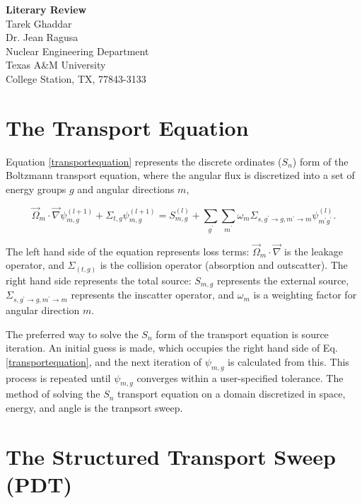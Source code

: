 \documentclass[11pt, letterpaper,titlepage,oneside]{article}
\newcommand{\titles}{\LARGE \textbf{Literary Review}}
\newcommand{\authors}{\normalsize Tarek Ghaddar \\ Dr. Jean Ragusa}
\newcommand{\department}{\normalsize Nuclear Engineering Department}
\newcommand{\university}{\normalsize Texas A\&M University}
\newcommand{\locations}{\normalsize College Station, TX, 77843-3133}
\begin{document}
\begin{titlepage}
\begin{center}
  \vspace*{3.81 cm}
  \titles\\
  \vspace*{4.445cm}
  \authors \\
  \vspace*{2.54cm} 
  \department \\
  \university \\
  \locations \\
\end{center}
\end{titlepage}

\section*{The Transport Equation}

Equation \ref{transportequation} represents the discrete ordinates ($S_n$) form of the Boltzmann transport equation, where the angular flux is discretized into a set of energy groups $g$ and angular directions $m$,

\begin{equation}
\vec{\Omega}_{m}\cdot \vec\nabla \psi^{(l+1)}_{m,g} + \Sigma_{t,g}\psi_{m,g}^{(l+1)} = S_{m,g}^{(l)} + \sum_{g^\prime}\sum_{m^{\prime}}\omega_m\Sigma_{s,g^{\prime}\to g,m^\prime\to m}\psi_{m^\prime g^\prime}^{(l)}.
\label{transportequation}
\end{equation}

The left hand side of the equation represents loss terms: $\vec{\Omega}_{m}\cdot \vec\nabla$ is the leakage operator, and $\Sigma_{(t,g)}$ is the collision operator (absorption and outscatter). The right hand side represents the total source: $S_{m,g}$ represents the external source, $\Sigma_{s,g^{\prime}\to g,m^\prime\to m}$ represents the inscatter operator, and $\omega_m$ is a weighting factor for angular direction $m$. 

The preferred way to solve the $S_n$ form of the transport equation is source iteration. An initial guess is made, which occupies the right hand side of Eq. \ref{transportequation}, and the next iteration of $\psi_{m,g}$ is calculated from this. This process is repeated until $\psi_{m,g}$ converges within a user-specified tolerance. The method of solving the $S_n$ transport equation on a domain discretized in space, energy, and angle is the tranpsort sweep.

\section*{The Structured Transport Sweep (PDT)}
\end{document}
